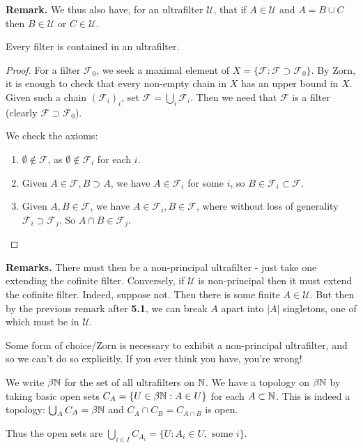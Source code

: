 \documentclass[10pt,a4paper]{article}
\begin{document}
\textbf{Remark.} We thus also have, for an ultrafilter $\mathcal{U}$, that if $A \in \mathcal{U}$ and $A = B \cup C$ then $B \in \mathcal{U}$ or $C \in \mathcal{U}$.
\begin{theorem}
  Every filter is contained in an ultrafilter.
\end{theorem}
\begin{proof}
  For a filter $\mathcal{F}_0$, we seek a maximal element of $X = \{\mathcal{F}: \mathcal{F} \supset \mathcal{F}_0\}$. By Zorn, it is enough to check that every non-empty chain in $X$ has an upper bound in $X$. Given such a chain $(\mathcal{F}_i)_i$, set $\mathcal{F} = \bigcup_i \mathcal{F}_i$. Then we need that $\mathcal{F}$ is a filter (clearly $\mathcal{F} \supset \mathcal{F}_0$).

  We check the axioms:
  \begin{enumerate}
    \item $\emptyset \notin \mathcal{F}$, as $\emptyset \notin \mathcal{F}_i$ for each $i$.
    \item Given $A \in \mathcal{F}, B \supset A$, we have $A \in \mathcal{F}_i$ for some $i$, so $B \in \mathcal{F}_i \subset \mathcal{F}$.
    \item Given $A, B \in \mathcal{F}$, we have $A \in \mathcal{F}_i, B \in \mathcal{F}$, where without loss of generality $\mathcal{F}_i \supset \mathcal{F}_j$. So $A \cap B \in \mathcal{F}_j$.
  \end{enumerate}
\end{proof}
\textbf{Remarks.} There must then be a non-principal ultrafilter - just take one extending the cofinite filter. Conversely, if $\mathcal{U}$ is non-principal then it must extend the cofinite filter. Indeed, suppose not. Then there is some finite $A \in \mathcal{U}$. But then by the previous remark after \textbf{5.1}, we can break $A$ apart into $|A|$ singletons, one of which must be in $\mathcal{U}$.

Some form of choice/Zorn is necessary to exhibit a non-principal ultrafilter, and so we can't do so explicitly. If you ever think you have, you're wrong!

We write $\beta\mathbb{N}$ for the set of all ultrafilters on $\mathbb{N}$. We have a topology on $\beta\mathbb{N}$ by taking basic open sets $C_A = \{U \in \beta\mathbb{N}: A \in U\}$ for each $A \subset \mathbb{N}$. This is indeed a topology: $\bigcup_A C_A = \beta \mathbb{N}$ and $C_A \cap C_B = C_{A\cap B}$ is open.

Thus the open sets are $\bigcup_{i \in I} C_{A_i} = \{U : A_i \in U, \text{ some }i\}$.
\end{document}

